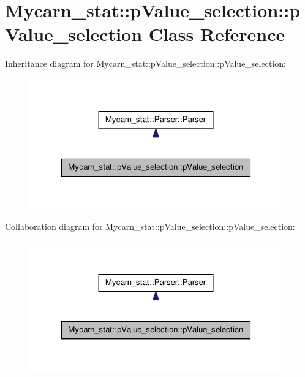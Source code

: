 \hypertarget{classMycarn__stat_1_1pValue__selection_1_1pValue__selection}{
\section{\-Mycarn\-\_\-stat\-:\-:p\-Value\-\_\-selection\-:\-:p\-Value\-\_\-selection \-Class \-Reference}
\label{classMycarn__stat_1_1pValue__selection_1_1pValue__selection}
}


\-Inheritance diagram for \-Mycarn\-\_\-stat\-:\-:p\-Value\-\_\-selection\-:\-:p\-Value\-\_\-selection\-:
\nopagebreak
\begin{figure}[H]
\begin{center}
\leavevmode
\includegraphics[width=310pt]{classMycarn__stat_1_1pValue__selection_1_1pValue__selection__inherit__graph}
\end{center}
\end{figure}


\-Collaboration diagram for \-Mycarn\-\_\-stat\-:\-:p\-Value\-\_\-selection\-:\-:p\-Value\-\_\-selection\-:
\nopagebreak
\begin{figure}[H]
\begin{center}
\leavevmode
\includegraphics[width=310pt]{classMycarn__stat_1_1pValue__selection_1_1pValue__selection__coll__graph}
\end{center}
\end{figure}
